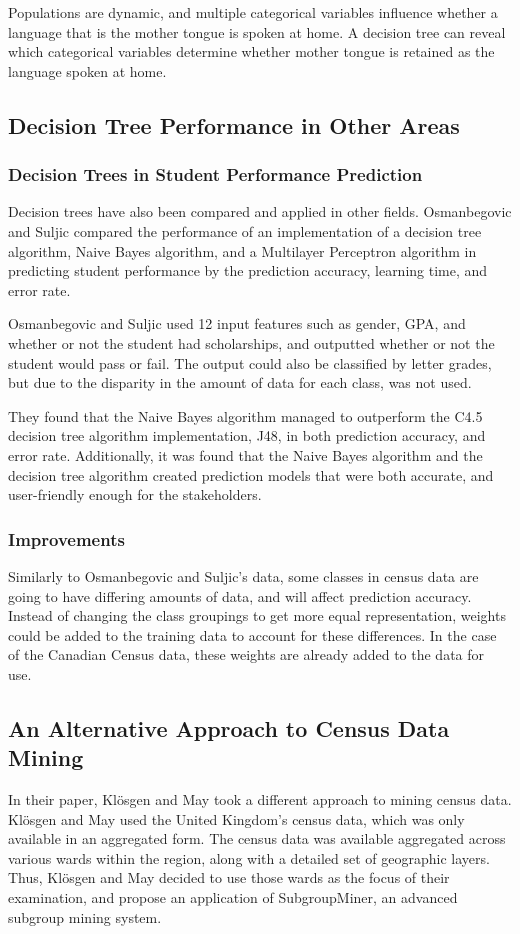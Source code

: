 \documentclass[10pt, conference, compsocconf]{IEEEtran}
\begin{document}
Populations are dynamic, and multiple categorical variables influence whether a language that is the mother tongue is spoken at home. A decision tree can reveal which categorical variables determine whether mother tongue is retained as the language spoken at home.

\subsection{Decision Tree Performance in Other Areas}
\subsubsection{Decision Trees in Student Performance Prediction}
Decision trees have also been compared and applied in other fields. Osmanbegovic and Suljic compared the performance of an implementation of a decision tree algorithm, Naive Bayes algorithm, and a Multilayer Perceptron algorithm in predicting student performance by the prediction accuracy, learning time, and error rate. \cite{performance1}

Osmanbegovic and Suljic used 12 input features such as gender, GPA, and whether or not the student had scholarships, and outputted whether or not the student would pass or fail. The output could also be classified by letter grades, but due to the disparity in the amount of data for each class, was not used. \cite{performance1}

They found that the Naive Bayes algorithm managed to outperform the C4.5 decision tree algorithm implementation, J48, in both prediction accuracy, and error rate. Additionally, it was found that the Naive Bayes algorithm and the decision tree algorithm created prediction models that were both accurate, and user-friendly enough for the stakeholders. \cite{performance1}

\subsubsection{Improvements}
Similarly to Osmanbegovic and Suljic's data, some classes in census data are going to have differing amounts of data, and will affect prediction accuracy. Instead of changing the class groupings to get more equal representation, weights could be added to the training data to account for these differences. In the case of the Canadian Census data, these weights are already added to the data for use.

\subsection{An Alternative Approach to Census Data Mining}
In their paper, Klösgen and May took a different approach to mining census data. Klösgen and May used the United Kingdom's census data, which was only available in an aggregated form. The census data was available aggregated across various wards within the region, along with a detailed set of geographic layers. Thus, Klösgen and May decided to use those wards as the focus of their examination, and propose an application of SubgroupMiner, an advanced subgroup mining system. \cite{census1}
\end{document}
